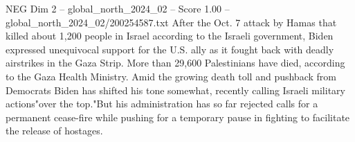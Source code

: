 \begin{textsample}{NEG Dim 2 – global\_north\_2024\_02 – Score 1.00 – global\_north\_2024\_02/200254587.txt}
After the Oct. 7 attack by Hamas that killed about 1,200 people in Israel according to the Israeli government, Biden expressed unequivocal support for the U.S. ally as it fought back with deadly airstrikes in the Gaza Strip.
More than 29,600 Palestinians have died, according to the Gaza Health Ministry.
Amid the growing death toll and pushback from Democrats Biden has shifted his tone somewhat, recently calling Israeli military actions"over the top."But his administration has so far rejected calls for a permanent cease-fire while pushing for a temporary pause in fighting to facilitate the release of hostages.

\end{textsample}
